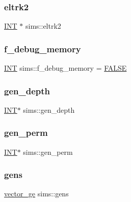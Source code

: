 \subsubsection{\texorpdfstring{eltrk2}{eltrk2}}
{\footnotesize\ttfamily \mbox{\hyperlink{galois_8h_a09fddde158a3a20bd2dcadb609de11dc}{I\+NT}} $\ast$ sims\+::eltrk2}

\mbox{\label{classsims_a903d1be5cbcbfdcaabf491fb30bb2e54}} 
\subsubsection{\texorpdfstring{f\+\_\+debug\+\_\+memory}{f\_debug\_memory}}
{\footnotesize\ttfamily \mbox{\hyperlink{galois_8h_a09fddde158a3a20bd2dcadb609de11dc}{I\+NT}} sims\+::f\+\_\+debug\+\_\+memory = \mbox{\hyperlink{nauty_8h_aa93f0eb578d23995850d61f7d61c55c1}{F\+A\+L\+SE}}\hspace{0.3cm}{\ttfamily [static]}}

\mbox{\label{classsims_ad8fc021408c0dacd697f8bd9ea647456}} 
\subsubsection{\texorpdfstring{gen\+\_\+depth}{gen\_depth}}
{\footnotesize\ttfamily \mbox{\hyperlink{galois_8h_a09fddde158a3a20bd2dcadb609de11dc}{I\+NT}}$\ast$ sims\+::gen\+\_\+depth}

\mbox{\label{classsims_a411c00c78023dd47f7dc3324ff21a6a4}} 
\subsubsection{\texorpdfstring{gen\+\_\+perm}{gen\_perm}}
{\footnotesize\ttfamily \mbox{\hyperlink{galois_8h_a09fddde158a3a20bd2dcadb609de11dc}{I\+NT}}$\ast$ sims\+::gen\+\_\+perm}

\mbox{\label{classsims_ac1db131c547341a79a8955526bf8cdf6}} 
\subsubsection{\texorpdfstring{gens}{gens}}
{\footnotesize\ttfamily \mbox{\hyperlink{classvector__ge}{vector\+\_\+ge}} sims\+::gens}

